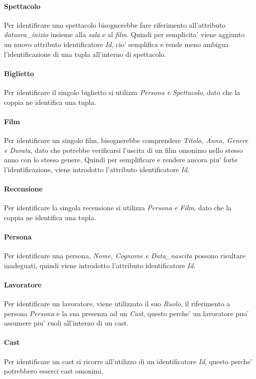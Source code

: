 \documentclass[10pt]{article}
\begin{document}
	\paragraph{Spettacolo}
	Per identificare uno spettacolo bisognerebbe fare riferimento all'attributo \textit{dataora\_inizio} insieme alla \textit{sala} e al \textit{film}. Quindi per semplicita' viene aggiunto un nuovo attributo identificatore \textit{Id}, cio' semplifica e rende meno ambigua l'identificazione di una tupla all'interno di spettacolo.
	\paragraph{Biglietto}
	Per identificare il singolo biglietto si utilizza \textit{Persona e Spettacolo}, dato che la coppia ne identifica una tupla.
	\paragraph{Film}
	Per identificare un singolo film, bisognerebbe comprendere \textit{Titolo, Anno, Genere e Durata}, dato che potrebbe verificarsi l'uscita di un film omonimo nello stesso anno con lo stesso genere. Quindi per semplificare e rendere ancora piu' forte l'identificazione, viene introdotto l'attributo identificatore \textit{Id}.
	\paragraph{Recensione}
	Per identificare la singola recensione si utilizza \textit{Persona e Film}, dato che la coppia ne identifica una tupla.
	\paragraph{Persona}
	Per identificare una persona, \textit{Nome, Cognome e Data\_nascita} possono risultare inadeguati, quindi viene introdotto l'attributo identificatore \textit{Id}.
	\paragraph{Lavoratore}
	Per identificare un lavoratore, viene utilizzato il suo \textit{Ruolo}, il riferimento a persona \textit{Persona} e la sua presenza ad un \textit{Cast}, questo perche' un lavoratore puo' assumere piu' ruoli all'interno di un cast.
	\paragraph{Cast}
	Per identificare un cast si ricorre all'utilizzo di un identificatore \textit{Id}, questo perche' potrebbero esserci cast omonimi.
\end{document}
